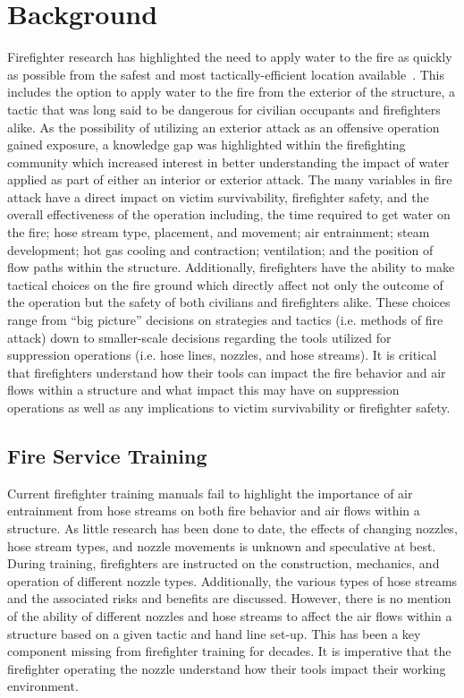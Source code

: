 \documentclass[12pt,oneside]{book}
\begin{document}
\newpage

\chapter{Background}

Firefighter research has highlighted the need to apply water to the fire as quickly as possible from the safest and most tactically-efficient location available~\cite{DHS2008,DHS2010,DHS2011}. This includes the option to apply water to the fire from the exterior of the structure, a tactic that was long said to be dangerous for civilian occupants and firefighters alike. As the possibility of utilizing an exterior attack as an offensive operation gained exposure, a knowledge gap was highlighted within the firefighting community which increased interest in better understanding the impact of water applied as part of either an interior or exterior attack. The many variables in fire attack have a direct impact on victim survivability, firefighter safety, and the overall effectiveness of the operation including, the time required to get water on the fire; hose stream type, placement, and movement; air entrainment; steam development; hot gas cooling and contraction; ventilation; and the position of flow paths within the structure. Additionally, firefighters have the ability to make tactical choices on the fire ground which directly affect not only the outcome of the operation but the safety of both civilians and firefighters alike. These choices range from ``big picture'' decisions on strategies and tactics (i.e. methods of fire attack) down to smaller-scale decisions regarding the tools utilized for suppression operations (i.e. hose lines, nozzles, and hose streams). It is critical that firefighters understand how their tools can impact the fire behavior and air flows within a structure and what impact this may have on suppression operations as well as any implications to victim survivability or firefighter safety.

\section{Fire Service Training}

Current firefighter training manuals fail to highlight the importance of air entrainment from hose streams on both fire behavior and air flows within a structure. As little research has been done to date, the effects of changing nozzles, hose stream types, and nozzle movements is unknown and speculative at best. During training, firefighters are instructed on the construction, mechanics, and operation of different nozzle types. Additionally, the various types of hose streams and the associated risks and benefits are discussed. However, there is no mention of the ability of different nozzles and hose streams to affect the air flows within a structure based on a given tactic and hand line set-up. This has been a key component missing from firefighter training for decades. It is imperative that the firefighter operating the nozzle understand how their tools impact their working environment. 
\end{document}
